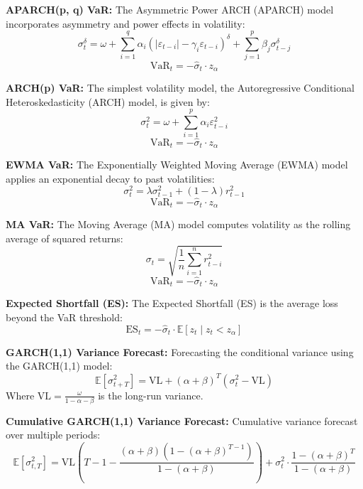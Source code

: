 \documentclass[12pt]{article}
\begin{document}
\vspace{0.5cm}

\textbf{APARCH(p, q) VaR:}  
The Asymmetric Power ARCH (APARCH) model incorporates asymmetry and power effects in volatility:
\[
\sigma_t^\delta = \omega + \sum_{i=1}^q \alpha_i (|\varepsilon_{t-i}| - \gamma_i \varepsilon_{t-i})^\delta + \sum_{j=1}^p \beta_j \sigma_{t-j}^\delta
\]
\[
\text{VaR}_t = -\hat{\sigma}_t \cdot z_\alpha
\]

\vspace{0.5cm}

\textbf{ARCH(p) VaR:}  
The simplest volatility model, the Autoregressive Conditional Heteroskedasticity (ARCH) model, is given by:
\[
\sigma_t^2 = \omega + \sum_{i=1}^p \alpha_i \varepsilon_{t-i}^2
\]
\[
\text{VaR}_t = -\hat{\sigma}_t \cdot z_\alpha
\]

\vspace{0.5cm}

\textbf{EWMA VaR:}  
The Exponentially Weighted Moving Average (EWMA) model applies an exponential decay to past volatilities:
\[
\sigma_t^2 = \lambda \sigma_{t-1}^2 + (1 - \lambda) r_{t-1}^2
\]
\[
\text{VaR}_t = -\hat{\sigma}_t \cdot z_\alpha
\]

\vspace{0.5cm}

\textbf{MA VaR:}  
The Moving Average (MA) model computes volatility as the rolling average of squared returns:
\[
\sigma_t = \sqrt{ \frac{1}{n} \sum_{i=1}^n r_{t-i}^2 }
\]
\[
\text{VaR}_t = -\hat{\sigma}_t \cdot z_\alpha
\]

\vspace{0.5cm}

\textbf{Expected Shortfall (ES):}  
The Expected Shortfall (ES) is the average loss beyond the VaR threshold:
\[
\text{ES}_t = -\hat{\sigma}_t \cdot \mathbb{E}[z_t \mid z_t < z_\alpha]
\]

\vspace{0.5cm}

\textbf{GARCH(1,1) Variance Forecast:}  
Forecasting the conditional variance using the GARCH(1,1) model:
\[
\mathbb{E}[\sigma_{t+T}^2] = \text{VL} + (\alpha + \beta)^T (\sigma_t^2 - \text{VL})
\]
Where \(\text{VL} = \frac{\omega}{1 - \alpha - \beta}\) is the long-run variance.

\vspace{0.5cm}

\textbf{Cumulative GARCH(1,1) Variance Forecast:}  
Cumulative variance forecast over multiple periods:
\[
\mathbb{E}[\sigma_{t,T}^2] = \text{VL} \left( T - 1 - \frac{(\alpha + \beta)(1 - (\alpha + \beta)^{T - 1})}{1 - (\alpha + \beta)} \right) + \sigma_t^2 \cdot \frac{1 - (\alpha + \beta)^T}{1 - (\alpha + \beta)}
\]
\end{document}
